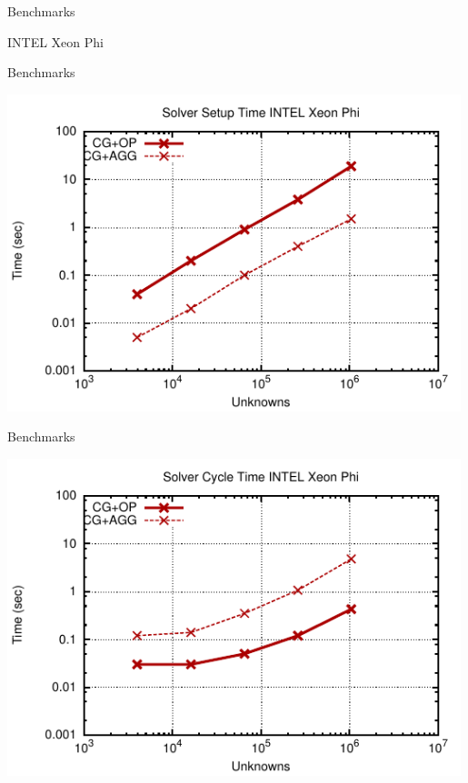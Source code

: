 \begin{frame}{Benchmarks}
  \begin{center}
   INTEL Xeon Phi
  \end{center}
\end{frame}
\begin{frame}{Benchmarks}
  \begin{center}
   \includegraphics[width=0.99\textwidth]{figures/mic-setup.pdf}
  \end{center}
\end{frame}
\begin{frame}{Benchmarks}
  \begin{center}
   \includegraphics[width=0.99\textwidth]{figures/mic-cycle.pdf}
  \end{center}
\end{frame}
